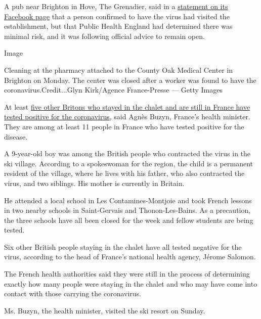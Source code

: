 A pub near Brighton in Hove, The Grenadier, said in a
\href{https://www.facebookcorewwwi.onion/thegrenadier/posts/620833655361749?__xts__\%5B0\%5D=68.ARCcECQenKv0mP5H_9Xqdz0l9ZPK9eD5ipbnnR2ZPR-AWq6od8K3R4oH72iu8MMZlT75bgkQgBSIWQsC7WwRqqoJ6eSXzN8LBOfay970oaMyxcYoJbgkDP6_wBuCyrvQQtgaB5-GIBJu-gpxNvXcbtxSRfb0BgpQBPmOWjk718Cl47XnlfW0jvqU52SIj04PyzgNrAjySElFTv1-0HaUpIrgTMh2ZeCZ8kjODcMVe2Mj_jkY4U618_jaXSXRhDxXgMTj8lasZM3W8b8HQ0NWgPrq659Lj2RT3J7RI6qBuQ8YPBC5XNReeCq25pHqkYyvY3pvw8lNe_eEGvJShCN-lpM\&__tn__=-R}{statement
on its Facebook page} that a person confirmed to have the virus had
visited the establishment, but that Public Health England had determined
there was minimal risk, and it was following official advice to remain
open.

Image

Cleaning at the pharmacy attached to the County Oak Medical Center in
Brighton on Monday. The center was closed after a worker was found to
have the coronavirus.Credit...Glyn Kirk/Agence France-Presse --- Getty
Images

At least \href{https://www.dailymotion.com/video/x7rmoy6}{five other
Britons who stayed in the chalet and are still in France have tested
positive for the coronavirus}, said Agnès Buzyn, France's health
minister. They are among at least 11 people in France who have tested
positive for the disease.

A 9-year-old boy was among the British people who contracted the virus
in the ski village. According to a spokeswoman for the region, the child
is a permanent resident of the village, where he lives with his father,
who also contracted the virus, and two siblings. His mother is currently
in Britain.

He attended a local school in Les Contamines-Montjoie and took French
lessons in two nearby schools in Saint-Gervais and Thonon-Les-Bains. As
a precaution, the three schools have all been closed for the week and
fellow students are being tested.

Six other British people staying in the chalet have all tested negative
for the virus, according to the head of France's national health agency,
Jérome Salomon.

The French health authorities said they were still in the process of
determining exactly how many people were staying in the chalet and who
may have come into contact with those carrying the coronavirus.

Ms. Buzyn, the health minister, visited the ski resort on Sunday.

